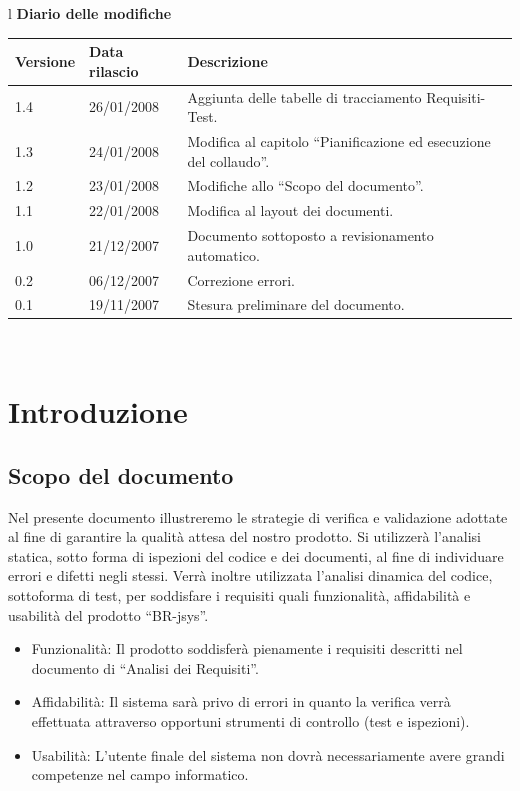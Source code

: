 \documentclass[11pt,titlepage,a4paper]{report}
\begin{document}
\begin{center}
\begin{table}[hbtp]
\large{
\begin{tabular}{l}
\Large{\textbf{\textsf{Diario delle modifiche}}} \\
\begin{tabular}{||p{2cm}||p{3.5cm}||p{6cm}||}
\hline
\textbf{Versione} & \textbf{Data rilascio} & \textbf{Descrizione} \\ \hline
1.4 & 26/01/2008 & Aggiunta delle tabelle di tracciamento Requisiti-Test.\\ \hline
1.3 & 24/01/2008 & Modifica al capitolo ``Pianificazione ed esecuzione del collaudo''.\\ \hline
1.2 & 23/01/2008 & Modifiche allo ``Scopo del documento''.\\ \hline
1.1 & 22/01/2008 & Modifica al layout dei documenti.\\ \hline
1.0 & 21/12/2007 & Documento sottoposto a revisionamento automatico.\\ \hline
0.2 & 06/12/2007 & Correzione errori. \\ \hline
0.1 & 19/11/2007 & Stesura preliminare del documento. \\ \hline
\end{tabular} \\
\end{tabular}

}
\end{table}
\end{center}

\tableofcontents

\chapter{Introduzione}
\section{Scopo del documento}
Nel presente documento illustreremo le strategie di verifica e validazione adottate al fine di garantire la qualit\`a attesa del nostro prodotto. Si utilizzer\`a l'analisi statica, sotto forma di ispezioni del codice e dei documenti, al fine di individuare errori e difetti negli stessi. Verr\`a inoltre utilizzata l'analisi dinamica del codice, sottoforma di test, per soddisfare i requisiti quali funzionalit\`a, affidabilit\`a e usabilit\`a del prodotto ``BR-jsys''.
\begin{itemize}
\item Funzionalit\`a: \newline
Il prodotto soddisfer\`a pienamente i requisiti descritti nel documento di ``Analisi dei Requisiti''.
\item Affidabilit\`a: \newline
Il sistema sar\`a privo di errori in quanto la verifica verr\`a effettuata attraverso opportuni strumenti di controllo (test e ispezioni).
\item Usabilit\`a:
L'utente finale del sistema non dovr\`a necessariamente avere grandi competenze nel campo informatico.
\end{itemize}
\end{document}
